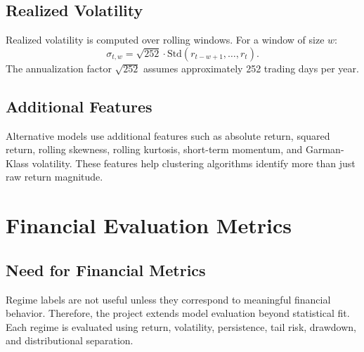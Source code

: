 \documentclass[12pt,a4paper]{report}
\begin{document}
\section{Realized Volatility}
Realized volatility is computed over rolling windows. For a window of size $w$:
\begin{equation}
    \sigma_{t,w} = \sqrt{252}\cdot \text{Std}(r_{t-w+1}, \ldots, r_t).
\end{equation}
The annualization factor $\sqrt{252}$ assumes approximately 252 trading days per year.

\section{Additional Features}
Alternative models use additional features such as absolute return, squared return, rolling skewness, rolling kurtosis, short-term momentum, and Garman-Klass volatility. These features help clustering algorithms identify more than just raw return magnitude.

\chapter{Financial Evaluation Metrics}
\section{Need for Financial Metrics}
Regime labels are not useful unless they correspond to meaningful financial behavior. Therefore, the project extends model evaluation beyond statistical fit. Each regime is evaluated using return, volatility, persistence, tail risk, drawdown, and distributional separation.
\end{document}
